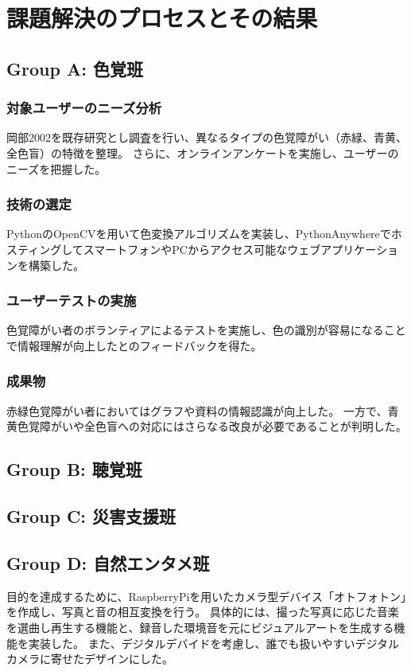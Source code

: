 \section{課題解決のプロセスとその結果}
\subsection{Group A: 色覚班}
\subsubsection{対象ユーザーのニーズ分析}
岡部2002\cite{okabe2002color}を既存研究とし調査を行い、異なるタイプの色覚障がい（赤緑、青黄、全色盲）の特徴を整理。
さらに、オンラインアンケートを実施し、ユーザーのニーズを把握した。
\subsubsection{技術の選定}
PythonのOpenCVを用いて色変換アルゴリズムを実装し、PythonAnywhereでホスティングしてスマートフォンやPCからアクセス可能なウェブアプリケーションを構築した。
\subsubsection{ユーザーテストの実施}
色覚障がい者のボランティアによるテストを実施し、色の識別が容易になることで情報理解が向上したとのフィードバックを得た。
\subsubsection{成果物}
赤緑色覚障がい者においてはグラフや資料の情報認識が向上した。
一方で、青黄色覚障がいや全色盲への対応にはさらなる改良が必要であることが判明した。

\subsection{Group B: 聴覚班}

\subsection{Group C: 災害支援班}

\subsection{Group D: 自然エンタメ班}
目的を達成するために、RaspberryPiを用いたカメラ型デバイス「オトフォトン」を作成し、写真と音の相互変換を行う。
具体的には、撮った写真に応じた音楽を選曲し再生する機能と、録音した環境音を元にビジュアルアートを生成する機能を実装した。
また、デジタルデバイドを考慮し、誰でも扱いやすいデジタルカメラに寄せたデザインにした。

